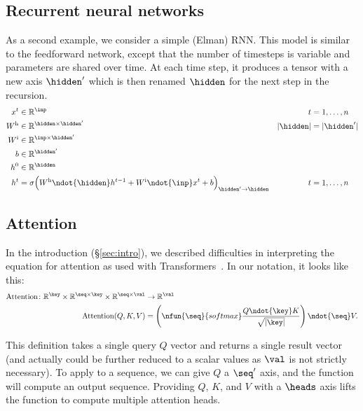 \subsection{Recurrent neural networks}
\label{sec:rnn}

As a second example, we consider a simple (Elman) RNN. This model is similar to the feedforward network, except that the number of timesteps is variable and parameters are shared over time. At each time step, it produces a tensor with a new axis $\hidden'$ which is then renamed $\hidden$ for the next step in the recursion. 
\begin{align*}
x^{t} &\in \mathbb{R}^{\inp} & t &= 1, \ldots, n \\
W^{\text{h}} &\in \mathbb{R}^{\hidden \times \hidden'} & |\hidden| &= |\hidden'| \\
W^{\text{i}} &\in \mathbb{R}^{\inp \times \hidden'} \\
b &\in \mathbb{R}^{\hidden'} \\
h^{0} &\in \mathbb{R}^{\hidden} \\
h^{t} &= \sigma\Bigl( W^{\text{h}} \ndot{\hidden} h^{t-1} + W^{\text{i}} \ndot{\inp} x^{t} + b \Bigr)_{\hidden'\rightarrow\hidden} & t &= 1, \ldots, n
\end{align*}

\subsection{Attention}
\label{sec:attention}

In the introduction (\S\ref{sec:intro}), we described difficulties in interpreting the equation for attention as used with Transformers~\citep{vaswani+:2017}. In our notation, it looks like this:
\begin{align}
  \text{Attention} \colon \mathbb{R}^{\key} \times \mathbb{R}^{\seq \times\key} \times \mathbb{R}^{\seq \times\val} &\rightarrow \mathbb{R}^{\val} \\
  \text{Attention}(Q,K,V) &= \left( \nfun{\seq}{softmax} \frac{Q \ndot{\key} K}{\sqrt{|\key|}} \right) \ndot{\seq} V. \label{eq:def_att}
\end{align}

This definition takes a single query $Q$ vector and returns a single result vector (and actually could be further reduced to a scalar values as $\val$ is not strictly necessary). To apply to a sequence, we can give $Q$ a $\seq'$ axis, and the function will compute an output sequence. Providing $Q$, $K$, and $V$ with a $\heads$ axis lifts the function to compute multiple attention heads. 

